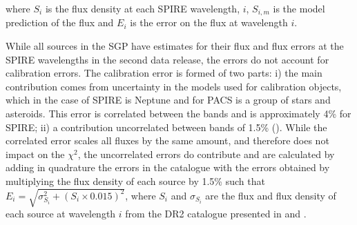 where $S_i$ is the flux density at each SPIRE wavelength, $i$, $S_{i,m}$ is the model prediction of the flux and $E_i$ is the error on the flux at wavelength $i$. 

While all sources in the SGP have estimates for their flux and flux errors at the SPIRE wavelengths in the second data release, the errors do not account for calibration errors. The calibration error is formed of two parts: i) the main contribution comes from uncertainty in the models used for calibration objects, which in the case of SPIRE is Neptune and for PACS is a group of stars and asteroids. This error is correlated between the bands and is approximately 4\% for SPIRE; ii) a contribution uncorrelated between bands of 1.5\% (\citealt{Valiante_2016}). While the correlated error scales all fluxes by the same amount, and therefore does not impact on the $\chi^2$, the uncorrelated errors do contribute and are calculated by adding in quadrature the errors in the catalogue with the errors obtained by multiplying the flux density of each source by 1.5\% such that $E_i = \sqrt{\sigma_{S_i}^2 + (S_i \times 0.015)^2}$, where $S_i$ and $\sigma_{S_i}$ are the flux and flux density of each source at wavelength $i$ from the DR2 catalogue presented in \citealt{Valiante_2016} and \citealt{Maddox_2018}.

